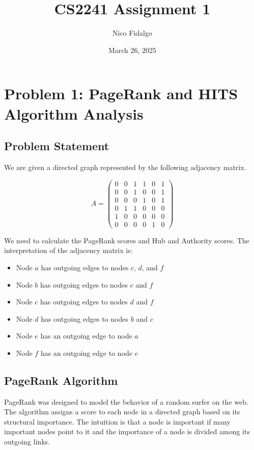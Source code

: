 \documentclass{article}
\title{CS2241 Assignment 1}
\author{Nico Fidalgo}
\date{March 26, 2025}
\begin{document}
\maketitle

\section{Problem 1: PageRank and HITS Algorithm Analysis}

\subsection{Problem Statement}
We are given a directed graph represented by the following adjacency matrix.

\begin{equation}
A = 
\begin{pmatrix}
0 & 0 & 1 & 1 & 0 & 1 \\
0 & 0 & 1 & 0 & 0 & 1 \\
0 & 0 & 0 & 1 & 0 & 1 \\
0 & 1 & 1 & 0 & 0 & 0 \\
1 & 0 & 0 & 0 & 0 & 0 \\
0 & 0 & 0 & 0 & 1 & 0
\end{pmatrix}
\end{equation}

We need to calculate the PageRank scores and Hub and Authority scores. The interpretation of the adjacency matrix is:

\begin{itemize}
    \item Node $a$ has outgoing edges to nodes $c$, $d$, and $f$
    \item Node $b$ has outgoing edges to nodes $c$ and $f$
    \item Node $c$ has outgoing edges to nodes $d$ and $f$
    \item Node $d$ has outgoing edges to nodes $b$ and $c$
    \item Node $e$ has an outgoing edge to node $a$
    \item Node $f$ has an outgoing edge to node $e$
\end{itemize}

\subsection{PageRank Algorithm}
PageRank was designed to model the behavior of a random surfer on the web. The algorithm assigns a score to each node in a directed graph based on its structural importance. The intuition is that a node is important if many important nodes point to it and the importance of a node is divided among its outgoing links.
\end{document}
